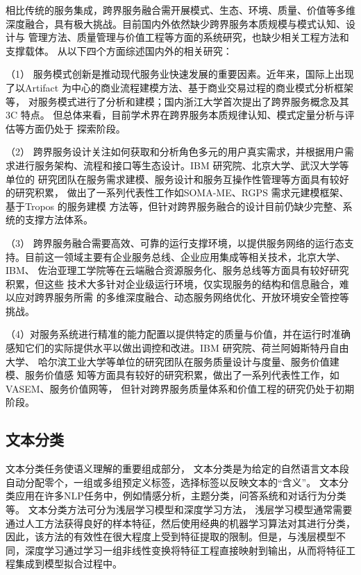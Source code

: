 相比传统的服务集成，跨界服务融合需开展模式、生态、环境、质量、价值等多维
深度融合，具有极大挑战。目前国内外依然缺少跨界服务本质规模与模式认知、设计与
管理方法、质量管理与价值工程等方面的系统研究，也缺少相关工程方法和支撑载体。
从以下四个方面综述国内外的相关研究：

（1） 服务模式创新是推动现代服务业快速发展的重要因素。近年来，国际上出现
了以Artifact 为中心的商业流程建模方法、基于商业交易过程的商业模式分析框架等，
对服务模式进行了分析和建模；国内浙江大学首次提出了跨界服务概念及其3C 特点。
但总体来看，目前学术界在跨界服务本质规律认知、模式定量分析与评估等方面仍处于
探索阶段。

（2） 跨界服务设计关注如何获取和分析角色多元的用户真实需求，并根据用户需
求进行服务架构、流程和接口等生态设计。IBM 研究院、北京大学、武汉大学等单位的
研究团队在服务需求建模、服务设计和服务互操作性管理等方面具有较好的研究积累，
做出了一系列代表性工作如SOMA-ME、RGPS 需求元建模框架、基于Tropos 的服务建模
方法等，但针对跨界服务融合的设计目前仍缺少完整、系统的支撑方法体系。

（3） 跨界服务融合需要高效、可靠的运行支撑环境，以提供服务网络的运行态支
持。目前这一领域主要有企业服务总线、企业应用集成等相关技术，北京大学、IBM、
佐治亚理工学院等在云端融合资源服务化、服务总线等方面具有较好研究积累，但这些
技术大多针对企业级运行环境，仅实现服务的结构和信息融合，难以应对跨界服务所需
的多维深度融合、动态服务网络优化、开放环境安全管控等挑战。

（4）对服务系统进行精准的能力配置以提供特定的质量与价值，并在运行时准确
感知它们的实际提供水平以做出调控和改进。IBM 研究院、荷兰阿姆斯特丹自由大学、
哈尔滨工业大学等单位的研究团队在服务质量设计与度量、服务价值建模、服务价值感
知等方面具有较好的研究积累，做出了一系列代表性工作，如VASEM、服务价值网等，
但针对跨界服务质量体系和价值工程的研究仍处于初期阶段。

\subsection{文本分类}
文本分类任务使语义理解的重要组成部分，
文本分类是为给定的自然语言文本段自动分配零个，一组或多组预定义标签，选择标签以反映文本的“含义”。
文本分类应用在许多NLP任务中，例如情感分析，主题分类，问答系统和对话行为分类等。
文本分类方法可分为浅层学习模型和深度学习方法，
浅层学习模型通常需要通过人工方法获得良好的样本特征，然后使用经典的机器学习算法对其进行分类，
因此，该方法的有效性在很大程度上受到特征提取的限制。但是，与浅层模型不同，深度学习通过学习一组非线性变换将特征工程直接映射到输出，从而将特征工程集成到模型拟合过程中。

